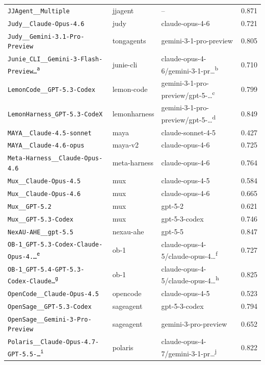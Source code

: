 \begin{center}
\begin{longtable}{lllc}
\texttt{JJAgent\_\_Multiple} & jjagent & -- & 0.871 \\
\texttt{Judy\_\_Claude-Opus-4.6} & judy & claude-opus-4-6 & 0.721 \\
\texttt{Judy\_\_Gemini-3.1-Pro-Preview} & tongagents & gemini-3-1-pro-preview & 0.805 \\
\texttt{Junie\_CLI\_\_Gemini-3-Flash-Preview\ldots\textsuperscript{a}} & junie-cli & claude-opus-4-6/gemini-3-1-pr\ldots\textsuperscript{b} & 0.710 \\
\texttt{LemonCode\_\_GPT-5.3-Codex} & lemon-code & gemini-3-1-pro-preview/gpt-5-\ldots\textsuperscript{c} & 0.799 \\
\texttt{LemonHarness\_GPT-5.3-CodeX} & lemonharness & gemini-3-1-pro-preview/gpt-5-\ldots\textsuperscript{d} & 0.849 \\
\texttt{MAYA\_\_Claude-4.5-sonnet} & maya & claude-sonnet-4-5 & 0.427 \\
\texttt{MAYA\_\_Claude-4.6-opus} & maya-v2 & claude-opus-4-6 & 0.725 \\
\texttt{Meta-Harness\_\_Claude-Opus-4.6} & meta-harness & claude-opus-4-6 & 0.764 \\
\texttt{Mux\_\_Claude-Opus-4.5} & mux & claude-opus-4-5 & 0.584 \\
\texttt{Mux\_\_Claude-Opus-4.6} & mux & claude-opus-4-6 & 0.665 \\
\texttt{Mux\_\_GPT-5.2} & mux & gpt-5-2 & 0.621 \\
\texttt{Mux\_\_GPT-5.3-Codex} & mux & gpt-5-3-codex & 0.746 \\
\texttt{NexAU-AHE\_\_gpt-5.5} & nexau-ahe & gpt-5-5 & 0.847 \\
\texttt{OB-1\_GPT-5.3-Codex-Claude-Opus-4.\ldots\textsuperscript{e}} & ob-1 & claude-opus-4-5/claude-opus-4\ldots\textsuperscript{f} & 0.727 \\
\texttt{OB-1\_GPT-5.4-GPT-5.3-Codex-Claude\ldots\textsuperscript{g}} & ob-1 & claude-opus-4-5/claude-opus-4\ldots\textsuperscript{h} & 0.825 \\
\texttt{OpenCode\_\_Claude-Opus-4.5} & opencode & claude-opus-4-5 & 0.523 \\
\texttt{OpenSage\_\_GPT-5.3-Codex} & sageagent & gpt-5-3-codex & 0.794 \\
\texttt{OpenSage\_\_Gemini-3-Pro-Preview} & sageagent & gemini-3-pro-preview & 0.652 \\
\texttt{Polaris\_\_Claude-Opus-4.7-GPT-5.5-\ldots\textsuperscript{i}} & polaris & claude-opus-4-7/gemini-3-1-pr\ldots\textsuperscript{j} & 0.822 \\

\end{longtable}
\end{center}
